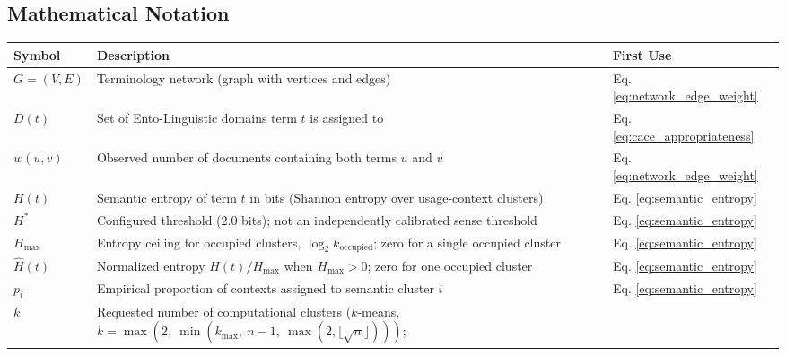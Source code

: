 \documentclass[
]{article}
\newcounter{none} %
\numberwithin{equation}{section}
\begin{document}
\subsection{Mathematical Notation}\label{mathematical-notation}

{\def\LTcaptype{none} %
\begin{longtable}[]{@{}
  >{\raggedright\arraybackslash}p{}
  >{\raggedright\arraybackslash}p{}
  >{\raggedright\arraybackslash}p{}@{}}
\toprule\noalign{}
\begin{minipage}[b]{\linewidth}\raggedright
Symbol
\end{minipage} & \begin{minipage}[b]{\linewidth}\raggedright
Description
\end{minipage} & \begin{minipage}[b]{\linewidth}\raggedright
First Use
\end{minipage} \\
\midrule\noalign{}
\endhead
\bottomrule\noalign{}
\endlastfoot
\(G = (V, E)\) & Terminology network (graph with vertices and edges) &
Eq. \ref{eq:network_edge_weight} \\
\(D(t)\) & Set of Ento-Linguistic domains term \(t\) is assigned to &
Eq. \ref{eq:cace_appropriateness} \\
\(w(u,v)\) & Observed number of documents containing both terms \(u\)
and \(v\) & Eq. \ref{eq:network_edge_weight} \\
\(H(t)\) & Semantic entropy of term \(t\) in bits (Shannon entropy over
usage-context clusters) & Eq. \ref{eq:semantic_entropy} \\
\(H^*\) & Configured threshold (2.0 bits); not an independently
calibrated sense threshold & Eq. \ref{eq:semantic_entropy} \\
\(H_{\max}\) & Entropy ceiling for occupied clusters,
\(\log_2 k_{\mathrm{occupied}}\); zero for a single occupied cluster &
Eq. \ref{eq:semantic_entropy} \\
\(\hat{H}(t)\) & Normalized entropy \(H(t) / H_{\max}\) when
\(H_{\max}>0\); zero for one occupied cluster & Eq.
\ref{eq:semantic_entropy} \\
\(p_i\) & Empirical proportion of contexts assigned to semantic cluster
\(i\) & Eq. \ref{eq:semantic_entropy} \\
\(k\) & Requested number of computational clusters (\(k\)-means,
\(k = \max(2,\ \min(k_{\max},\ n{-}1,\ \max(2, \lfloor\!\sqrt{n}\rfloor)))\);

\end{longtable}}
\end{document}
